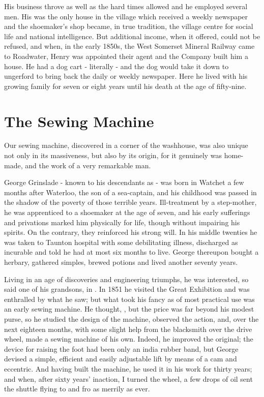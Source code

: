 His business throve as well as the hard times allowed and he employed several men. His was the only house in the village	which received	a weekly newspaper and the shoemaker's shop became, in true tradition, the village centre for social life and national intelligence. But additional income, when it offered, could not be refused, and when, in the early 1850s, the West Somerset Mineral Railway came to Roadwater, Henry was appointed their agent and the Company built him a house. He had a dog cart - literally - and the dog would take it down to ungerford to bring back the daily or weekly newspaper. Here he lived with his growing family for seven or eight years until his death at the age of fifty-nine.
 
\section{The Sewing Machine}  
 
Our sewing machine, discovered in a corner of	the washhouse,	was also unique not only in its massiveness, but	also by its	origin, for it	genuinely was home-made, and the work of a very remarkable man.

George Grinslade - known to his descendants as  - was born in Watchet a few months after Waterloo, the son of a sea-captain, and his childhood was passed in the shadow of the poverty of those terrible years. Ill-treatment by a step-mother, he was apprenticed to a shoemaker at the age of seven, and his early sufferings and privations marked him physically for life, though without impairing his spirits. On the contrary, they reinforced his strong will. In his middle twenties he was taken to Taunton hospital with some debilitating illness, discharged as incurable and told he had at most six months to live. George thereupon bought a herbary, gathered simples, brewed potions and lived another seventy years.

Living in an age of discoveries and engineering triumphs, he was interested, so said one of his grandsons, in . In 1851 he visited the Great Exhibition and was enthralled by what he saw; but what took his fancy as of most practical use was an early sewing machine. He thought, , but the price was far beyond his modest purse, so he studied the design of the machine, observed the action, and, over the next eighteen months, with some slight help from the blacksmith over the drive wheel, made a sewing machine of his own. Indeed, he improved the original; the device for raising the foot had been only an india rubber band, but George devised a simple, efficient and easily adjustable lift by means of a cam and eccentric. And having built the machine, he used it in his work for thirty years; and when, after sixty years’ inaction, I turned the wheel, a few drops of oil sent the shuttle flying to and fro as merrily as ever.

